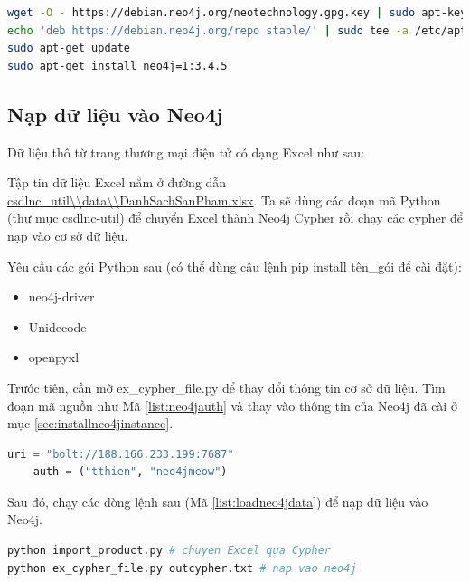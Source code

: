 \begin{lstlisting}[basicstyle=\tiny,language=bash,caption={Cài Neo4j},label={lst:neo4jinstall}]
wget -O - https://debian.neo4j.org/neotechnology.gpg.key | sudo apt-key add -
echo 'deb https://debian.neo4j.org/repo stable/' | sudo tee -a /etc/apt/sources.list.d/neo4j.list
sudo apt-get update
sudo apt-get install neo4j=1:3.4.5
\end{lstlisting}

\subsection{Nạp dữ liệu vào Neo4j}

Dữ liệu thô từ trang thương mại điện tử có dạng Excel như sau: 


Tập tin dữ liệu Excel nằm ở đường dẫn \url{csdlnc_util\\data\\DanhSachSanPham.xlsx}. Ta sẽ dùng các đoạn mã Python (thư mục csdlnc-util) để chuyển Excel thành Neo4j Cypher rồi chạy các cypher để nạp vào cơ sở dữ liệu. 

Yêu cầu các gói Python sau (có thể dùng câu lệnh pip install tên\_gói để cài đặt): 

\begin{itemize}
\item neo4j-driver
\item Unidecode 
\item openpyxl
\end{itemize}

Trước tiên, cần mỡ ex\_cypher\_file.py để thay đổi thông tin cơ sở dữ liệu. Tìm đoạn mã nguồn như Mã \ref{list:neo4jauth} và thay vào thông tin của Neo4j đã cài ở mục \ref{sec:installneo4jinstance}.

\begin{lstlisting}[language=python,caption={Thông tin Neo4j},label={list:neo4jauth}]
    uri = "bolt://188.166.233.199:7687"
    auth = ("tthien", "neo4jmeow")
\end{lstlisting}

Sau đó, chạy các dòng lệnh sau (Mã \ref{list:loadneo4jdata}) để nạp dữ liệu vào Neo4j.

\begin{lstlisting}[language=bash,caption={Cài Neo4j},label={list:loadneo4jdata}]
python import_product.py # chuyen Excel qua Cypher
python ex_cypher_file.py outcypher.txt # nap vao neo4j 
\end{lstlisting}

